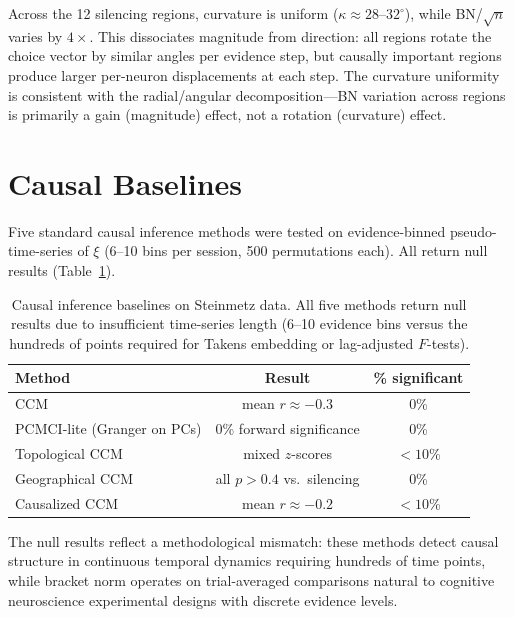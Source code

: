 \documentclass[9pt,lineno]{elife}
\begin{document}
Across the 12 silencing regions, curvature is uniform ($\kappa \approx 28$--$32^\circ$), while BN/\!$\sqrt{n}$ varies by $4\times$. This dissociates magnitude from direction: all regions rotate the choice vector by similar angles per evidence step, but causally important regions produce larger per-neuron displacements at each step. The curvature uniformity is consistent with the radial/angular decomposition---BN variation across regions is primarily a gain (magnitude) effect, not a rotation (curvature) effect.

\section{Causal Baselines}
\label{app:causal_baselines}

Five standard causal inference methods were tested on evidence-binned pseudo-time-series of $\xi$ (6--10 bins per session, 500 permutations each). All return null results (Table~\ref{tab:causal_baselines}).

\begin{table}[h]
\centering
\caption{Causal inference baselines on Steinmetz data. All five methods return null results due to insufficient time-series length (6--10 evidence bins versus the hundreds of points required for Takens embedding or lag-adjusted $F$-tests).}
\label{tab:causal_baselines}
\small
\begin{tabular}{lcc}
\toprule
Method & Result & \% significant \\
\midrule
CCM \citep{sugihara2012detecting} & mean $r \approx -0.3$ & 0\% \\
PCMCI-lite (Granger on PCs) & 0\% forward significance & 0\% \\
Topological CCM & mixed $z$-scores & $< 10$\% \\
Geographical CCM & all $p > 0.4$ vs.\ silencing & 0\% \\
Causalized CCM & mean $r \approx -0.2$ & $< 10$\% \\
\bottomrule
\end{tabular}
\end{table}

The null results reflect a methodological mismatch: these methods detect causal structure in continuous temporal dynamics requiring hundreds of time points, while bracket norm operates on trial-averaged comparisons natural to cognitive neuroscience experimental designs with discrete evidence levels.
\end{document}
